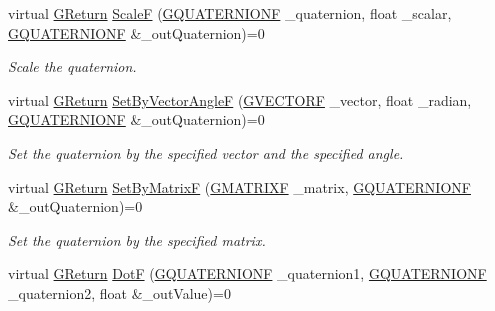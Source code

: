 \begin{DoxyCompactItemize}
virtual \mbox{\hyperlink{namespace_g_w_a67a839e3df7ea8a5c5686613a7a3de21}{G\+Return}} \mbox{\hyperlink{class_g_w_1_1_m_a_t_h_1_1_g_quaternion_ac807f57d533c019733a517566615516e}{ScaleF}} (\mbox{\hyperlink{struct_g_w_1_1_m_a_t_h_1_1_g_q_u_a_t_e_r_n_i_o_n_f}{G\+Q\+U\+A\+T\+E\+R\+N\+I\+O\+NF}} \+\_\+quaternion, float \+\_\+scalar, \mbox{\hyperlink{struct_g_w_1_1_m_a_t_h_1_1_g_q_u_a_t_e_r_n_i_o_n_f}{G\+Q\+U\+A\+T\+E\+R\+N\+I\+O\+NF}} \&\+\_\+out\+Quaternion)=0
\begin{DoxyCompactList}\small\item\em Scale the quaternion. \end{DoxyCompactList}\item 
virtual \mbox{\hyperlink{namespace_g_w_a67a839e3df7ea8a5c5686613a7a3de21}{G\+Return}} \mbox{\hyperlink{class_g_w_1_1_m_a_t_h_1_1_g_quaternion_a70d41e1e78ed85814b22eb4a328b6876}{Set\+By\+Vector\+AngleF}} (\mbox{\hyperlink{struct_g_w_1_1_m_a_t_h_1_1_g_v_e_c_t_o_r_f}{G\+V\+E\+C\+T\+O\+RF}} \+\_\+vector, float \+\_\+radian, \mbox{\hyperlink{struct_g_w_1_1_m_a_t_h_1_1_g_q_u_a_t_e_r_n_i_o_n_f}{G\+Q\+U\+A\+T\+E\+R\+N\+I\+O\+NF}} \&\+\_\+out\+Quaternion)=0
\begin{DoxyCompactList}\small\item\em Set the quaternion by the specified vector and the specified angle. \end{DoxyCompactList}\item 
virtual \mbox{\hyperlink{namespace_g_w_a67a839e3df7ea8a5c5686613a7a3de21}{G\+Return}} \mbox{\hyperlink{class_g_w_1_1_m_a_t_h_1_1_g_quaternion_aec0eb6ee4ee1557117b03a2104be21f0}{Set\+By\+MatrixF}} (\mbox{\hyperlink{struct_g_w_1_1_m_a_t_h_1_1_g_m_a_t_r_i_x_f}{G\+M\+A\+T\+R\+I\+XF}} \+\_\+matrix, \mbox{\hyperlink{struct_g_w_1_1_m_a_t_h_1_1_g_q_u_a_t_e_r_n_i_o_n_f}{G\+Q\+U\+A\+T\+E\+R\+N\+I\+O\+NF}} \&\+\_\+out\+Quaternion)=0
\begin{DoxyCompactList}\small\item\em Set the quaternion by the specified matrix. \end{DoxyCompactList}\item 
virtual \mbox{\hyperlink{namespace_g_w_a67a839e3df7ea8a5c5686613a7a3de21}{G\+Return}} \mbox{\hyperlink{class_g_w_1_1_m_a_t_h_1_1_g_quaternion_a3bb06da263ec25caa24f12a054ac0bd1}{DotF}} (\mbox{\hyperlink{struct_g_w_1_1_m_a_t_h_1_1_g_q_u_a_t_e_r_n_i_o_n_f}{G\+Q\+U\+A\+T\+E\+R\+N\+I\+O\+NF}} \+\_\+quaternion1, \mbox{\hyperlink{struct_g_w_1_1_m_a_t_h_1_1_g_q_u_a_t_e_r_n_i_o_n_f}{G\+Q\+U\+A\+T\+E\+R\+N\+I\+O\+NF}} \+\_\+quaternion2, float \&\+\_\+out\+Value)=0

\end{DoxyCompactItemize}
